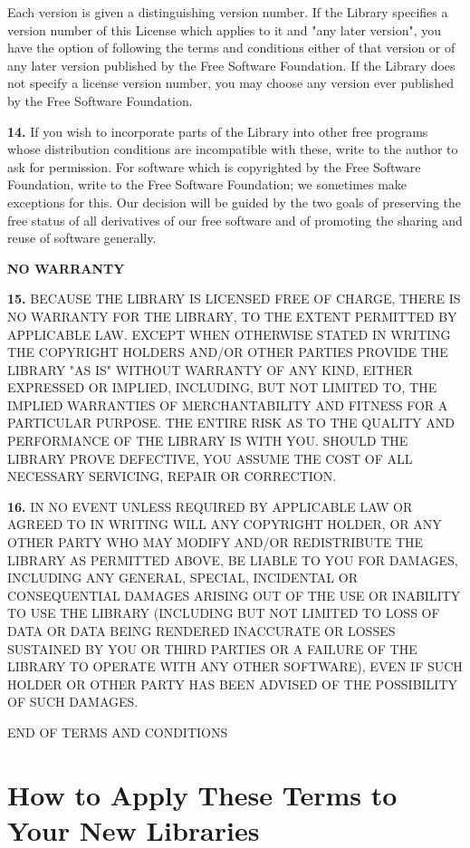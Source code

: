 Each version is given a distinguishing version number. If the Library
specifies a version number of this License which applies to it and "any later
version", you have the option of following the terms and conditions either of
that version or of any later version published by the Free Software
Foundation. If the Library does not specify a license version number, you may
choose any version ever published by the Free Software Foundation. 

{\bf 14.} If you wish to incorporate parts of the Library into other free
programs whose distribution conditions are incompatible with these, write to
the author to ask for permission. For software which is copyrighted by the
Free Software Foundation, write to the Free Software Foundation; we sometimes
make exceptions for this. Our decision will be guided by the two goals of
preserving the free status of all derivatives of our free software and of
promoting the sharing and reuse of software generally. 

{\bf NO WARRANTY} 

{\bf 15.} BECAUSE THE LIBRARY IS LICENSED FREE OF CHARGE, THERE IS NO WARRANTY
FOR THE LIBRARY, TO THE EXTENT PERMITTED BY APPLICABLE LAW. EXCEPT WHEN
OTHERWISE STATED IN WRITING THE COPYRIGHT HOLDERS AND/OR OTHER PARTIES PROVIDE
THE LIBRARY "AS IS" WITHOUT WARRANTY OF ANY KIND, EITHER EXPRESSED OR
IMPLIED, INCLUDING, BUT NOT LIMITED TO, THE IMPLIED WARRANTIES OF
MERCHANTABILITY AND FITNESS FOR A PARTICULAR PURPOSE. THE ENTIRE RISK AS TO
THE QUALITY AND PERFORMANCE OF THE LIBRARY IS WITH YOU. SHOULD THE LIBRARY
PROVE DEFECTIVE, YOU ASSUME THE COST OF ALL NECESSARY SERVICING, REPAIR OR
CORRECTION. 

{\bf 16.} IN NO EVENT UNLESS REQUIRED BY APPLICABLE LAW OR AGREED TO IN
WRITING WILL ANY COPYRIGHT HOLDER, OR ANY OTHER PARTY WHO MAY MODIFY AND/OR
REDISTRIBUTE THE LIBRARY AS PERMITTED ABOVE, BE LIABLE TO YOU FOR DAMAGES,
INCLUDING ANY GENERAL, SPECIAL, INCIDENTAL OR CONSEQUENTIAL DAMAGES ARISING
OUT OF THE USE OR INABILITY TO USE THE LIBRARY (INCLUDING BUT NOT LIMITED TO
LOSS OF DATA OR DATA BEING RENDERED INACCURATE OR LOSSES SUSTAINED BY YOU OR
THIRD PARTIES OR A FAILURE OF THE LIBRARY TO OPERATE WITH ANY OTHER SOFTWARE),
EVEN IF SUCH HOLDER OR OTHER PARTY HAS BEEN ADVISED OF THE POSSIBILITY OF SUCH
DAMAGES. 

END OF TERMS AND CONDITIONS 

\section{How to Apply These Terms to Your New Libraries}
\label{SEC45}


